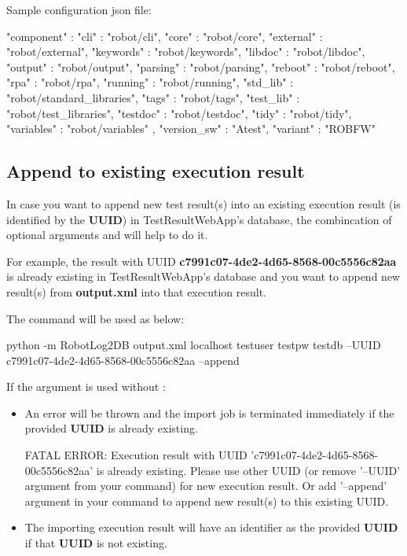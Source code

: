 \begin{itemize}
  Sample configuration json file:

\begin{pythoncode}
{
   "component"  : {
                  "cli"       : "robot/cli",
                  "core"      : "robot/core",
                  "external"  : "robot/external",
                  "keywords"  : "robot/keywords",
                  "libdoc"    : "robot/libdoc",
                  "output"    : "robot/output",
                  "parsing"   : "robot/parsing",
                  "reboot"    : "robot/reboot",
                  "rpa"       : "robot/rpa",
                  "running"   : "robot/running",
                  "std_lib"   : "robot/standard_libraries",
                  "tags"      : "robot/tags",
                  "test_lib"  : "robot/test_libraries",
                  "testdoc"   : "robot/testdoc",
                  "tidy"      : "robot/tidy",
                  "variables" : "robot/variables"
   },
   "version_sw" : "Atest",
   "variant"    : "ROBFW"
}
\end{pythoncode}
\end{itemize}

\subsection{Append to existing execution result}
In case you want to append new test result(s) into an existing execution result (is 
identified by the \textbf{UUID}) in TestResultWebApp's database, the combincation of 
optional arguments  and  will help to do it.

For example, the result with UUID \textbf{c7991c07-4de2-4d65-8568-00c5556c82aa} 
is already existing in TestResultWebApp's database and you want to append new 
result(s) from \textbf{output.xml} into that execution result.

The command will be used as below:
\begin{robotlog}
python -m RobotLog2DB output.xml localhost testuser testpw testdb --UUID c7991c07-4de2-4d65-8568-00c5556c82aa --append
\end{robotlog}

If the argument  is used without :
\begin{itemize}
  \item An error will be thrown and the import job is terminated immediately 
        if the provided \textbf{UUID} is already existing.
\begin{robotlog}
FATAL ERROR: Execution result with UUID 'c7991c07-4de2-4d65-8568-00c5556c82aa' is already existing.
             Please use other UUID (or remove '--UUID' argument from your command) for new execution result.
             Or add '--append' argument in your command to append new result(s) to this existing UUID.
\end{robotlog}
  \item The importing execution result will have an identifier as the provided 
        \textbf{UUID} if that \textbf{UUID} is not existing.
\end{itemize}

